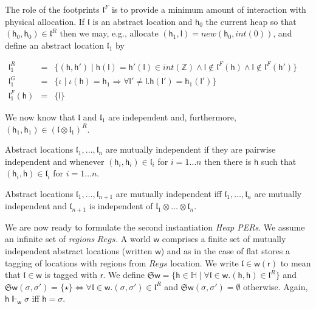 \documentclass[orivec]{llncs}
\makeatletter
\newif\iffull\fullfalse
\renewcommand\subsection{\@startsection{subsection}{2}{\z@}{-2\p@ \@plus -4\p@ \@minus -4\p@}{-0.5em \@plus -0.22em \@minus -0.1em}{\normalfont\normalsize\bfseries}}
\newcommand{\intt}[1]{\textit{int}(#1)}
\newcommand{\regid}{\ensuremath{\mathsf{r}}}
\newcommand{\Regids}{\ensuremath{\mathit{Regs}}}
\newcommand{\new}{\ensuremath{\mathit{new}}}
\newcommand{\Stores}{\ensuremath{\mathbb{H}}}
\newcommand{\loc}{\mathfrak{l}}
\newcommand{\cloc}{\ensuremath{\mathsf{l}}\xspace}
\newcommand\w{\ensuremath{\mathsf{w}}\xspace}
\newcommand\heap{\ensuremath{\mathsf{h}}\xspace}
\newcommand{\Astores}{\mathfrak{S}}
\makeatother
\begin{document}
The role of the footprints $\loc^F$ is to provide a minimum amount of
interaction with physical allocation. If $\loc$ is an abstract
location and $\heap_0$ the current heap so that
$(\heap_0,\heap_0)\in\loc^R$ then we may, e.g., allocate
$(\heap_1,\cloc)=\new(\heap_0,\intt 0)$, and define an abstract location
$\loc_1$ by

\(
 \begin{array}{lcl}
\loc_1^R&=&\{(\heap,\heap')\mid
\heap(\cloc)=\heap'(\cloc)\in\intt{\mathbb{Z}}\wedge
\cloc\not\in\loc^F(\heap)\wedge \cloc\not\in\loc^F(\heap')\}\\
\loc_1^G&=&\{\iota\mid \iota(\heap) = \heap_1 \Rightarrow \forall
\cloc'\neq\cloc.\heap(\cloc')=\heap_1(\cloc')\}\\
\loc_1^F(\heap)&=&\{\cloc\}  
 \end{array}
\)

\noindent
We now know that $\loc$ and $\loc_1$ are independent and, furthermore, 
$(\heap_1,\heap_1)\in(\loc\otimes\loc_1)^R$. 
\begin{definition}
Abstract  locations $\loc_1,\dots,\loc_n$ are mutually independent if they are pairwise independent and whenever $(\heap_i,\heap_i)\in\loc_i$ for $i=1\dots n$ then there is $\heap$ such that $(\heap_i,\heap)\in\loc_i$ for $i=1\dots n$. 
\end{definition}
\begin{lemma}
Abstract locations $\loc_1,\dots,\loc_{n+1}$ are mutually independent iff $\loc_1,\dots,\loc_n$ are mutually independent and $\loc_{n+1}$ is independent of $\loc_1\otimes\dots\otimes\loc_n$. 
\end{lemma}
\subsection{Heap PERs}
We are now ready to formulate the \iffull third \else second \fi
instantiation \emph{Heap
  PERs}. We assume an infinite set of \emph{regions} $\Regids$. A
world $\w$ comprises a finite set of mutually independent abstract
locations (written $\w$) and as in the case of flat stores a tagging of 
locations with regions from $\Regids$ 
location. We write $\loc\in \w(\regid)$ to mean that $\loc\in\w$
is tagged with $\regid$. We define $\Astores \w =
\{\heap\in\Stores\mid \forall \loc\in\w.(\heap,\heap)\in\loc^R\}$ and
$\Astores \w(\sigma,\sigma')=\{\star\}\iff \forall \loc\in\w.
(\sigma,\sigma')\in\loc^R$ and $\Astores
\w(\sigma,\sigma')=\emptyset$ otherwise. Again, $\heap\Vdash_\w \sigma$
iff $\heap=\sigma$. 
\end{document}
